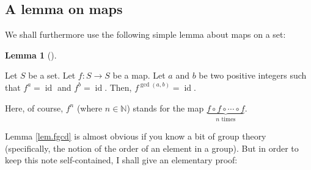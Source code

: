\documentclass[numbers=enddot,12pt,final,onecolumn,notitlepage]{scrartcl}%
\theoremstyle{definition}
\newtheorem{lem}[theo]{Lemma}
\newenvironment{lemma}[1][]
{\begin{lem}[#1]\begin{leftbar}}
{\end{leftbar}\end{lem}}
\begin{document}
\subsection{A lemma on maps}

We shall furthermore use the following simple lemma about maps on a set:

\begin{lemma}
\label{lem.fgcd}Let $S$ be a set. Let $f:S\rightarrow S$ be a map. Let $a$ and
$b$ be two positive integers such that $f^{a}=\operatorname*{id}$ and
$f^{b}=\operatorname*{id}$. Then, $f^{\gcd\left(  a,b\right)  }%
=\operatorname*{id}$.
\end{lemma}

Here, of course, $f^{n}$ (where $n\in\mathbb{N}$) stands for the map
$\underbrace{f\circ f\circ\cdots\circ f}_{n\text{ times}}$.

Lemma \ref{lem.fgcd} is almost obvious if you know a bit of group theory
(specifically, the notion of the order of an element in a group). But in order
to keep this note self-contained, I shall give an elementary proof:
\end{document}

